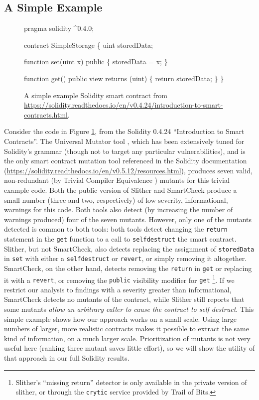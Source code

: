 \subsection{A Simple Example}

\begin{figure}
{\scriptsize
\begin{code}
pragma solidity ^0.4.0;

contract SimpleStorage \{
    uint storedData;

    function set(uint x) public \{
        storedData = x;
    \}

    function get() public view returns (uint) \{
        return storedData;
    \}
  \}
\end{code}
}
\caption{A simple example Solidity smart contract from \url{https://solidity.readthedocs.io/en/v0.4.24/introduction-to-smart-contracts.html}.}
\label{fig:sol424intro}
\end{figure}

Consider the code in Figure \ref{fig:sol424intro}, from the Solidity 0.4.24 ``Introduction to Smart Contracts''.  The Universal Mutator tool \cite{universalmutator,regexpMut}, which has been extensively tuned for Solidity's grammar (though not to target any particular vulnerabilities), and is the only smart contract mutation tool referenced in the Solidity documentation (\url{https://solidity.readthedocs.io/en/v0.5.12/resources.html}), produces seven valid, non-redundant (by Trivial Compiler Equivalence \cite{TCE}) mutants for this trivial example code.  Both the public version of Slither \cite{slither} and SmartCheck \cite{smartcheck} produce a small number (three and two, respectively) of low-severity, informational, warnings for this code.  Both tools also detect (by increasing the number of warnings produced) four of the seven mutants.  However, only one of the mutants detected is common to both tools: both tools detect changing the {\tt return} statement in the {\tt get} function to a call to {\tt selfdestruct} the smart contract.  Slither, but not SmartCheck, also detects replacing the assignment of {\tt storedData} in {\tt set} with either a {\tt selfdestruct} or {\tt revert}, or simply removing it altogether.  SmartCheck, on the other hand, detects removing the {\tt return} in {\tt get} or replacing it with a {\tt revert}, or removing the {\tt public} visibility modifier for {\tt get} \footnote{Slither's ``missing return'' detector is only available in the private version of slither, or through the {\tt crytic} service provided by Trail of Bits.}.  If we restrict our analysis to findings with a severity greater than informational, SmartCheck detects no mutants of the contract, while Slither still reports that some mutants \emph{allow an arbitrary caller to cause the contract to self destruct}.  This simple example shows how our approach works on a small scale.  Using large numbers of larger, more realistic contracts makes it possible to extract the same kind of information, on a much larger scale.  Prioritization of mutants is not very useful here (ranking three mutant saves little effort), so we will show the utility of that approach in our full Solidity results.

